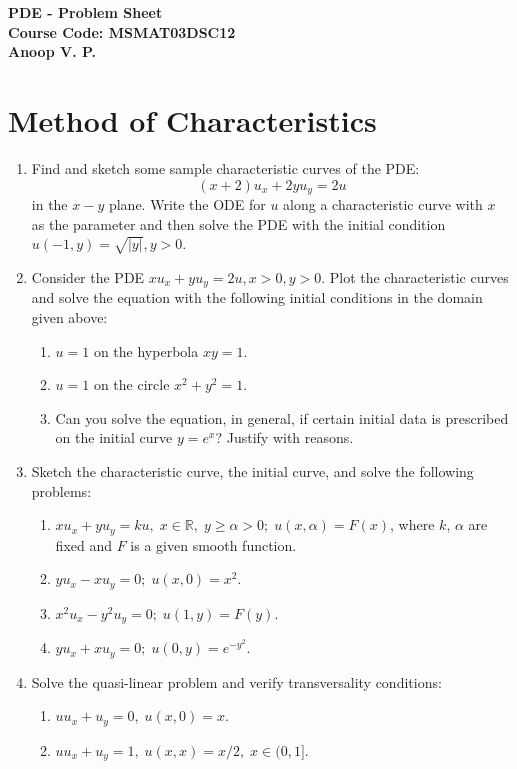 \documentclass[11pt,a4paper]{article}
\begin{document}
\begin{center}
\textbf{\Large PDE - Problem Sheet} \\[0.5em]
\textbf{Course Code: MSMAT03DSC12} \\[0.5em]
\textbf{Anoop V. P.}
\end{center}

\section{Method of Characteristics}

\begin{enumerate}

\item Find and sketch some sample characteristic curves of the PDE:
\[(x + 2)u_x + 2y u_y = 2u\]
in the $x-y$ plane. Write the ODE for $u$ along a characteristic curve with $x$ as the parameter and then solve the PDE with the initial condition $u(-1, y) = \sqrt{|y|}, y>0$.

\item Consider the PDE $x u_x + y u_y = 2u, x > 0, y > 0$. Plot the characteristic curves and solve the equation with the following initial conditions in the domain given above:
\begin{enumerate}
    \item $u = 1$ on the hyperbola $xy = 1$.
    \item $u = 1$ on the circle $x^2 + y^2 = 1$.
    \item Can you solve the equation, in general, if certain initial data is prescribed on the initial curve $y = e^x$? Justify with reasons.
\end{enumerate}

\item Sketch the characteristic curve, the initial curve, and solve the following problems:
\begin{enumerate}
    \item $x u_x + y u_y = k u, \; x \in \mathbb{R}, \; y \geq \alpha > 0; \; u(x, \alpha) = F(x)$, where $k$, $\alpha$ are fixed and $F$ is a given smooth function.
    \item $y u_x - x u_y = 0; \; u(x, 0) = x^2$.
    \item $x^2 u_x - y^2 u_y = 0; \; u(1, y) = F(y)$.
    \item $y u_x + x u_y = 0; \; u(0, y) = e^{-y^2}$.
\end{enumerate}

\item Solve the quasi-linear problem and verify transversality conditions:
\begin{enumerate}
    \item $u u_x + u_y = 0, \; u(x, 0) = x$.
    \item $u u_x + u_y = 1, \; u(x, x) = x/2, \; x \in (0, 1]$.
\end{enumerate}


\end{enumerate}
\end{document}
